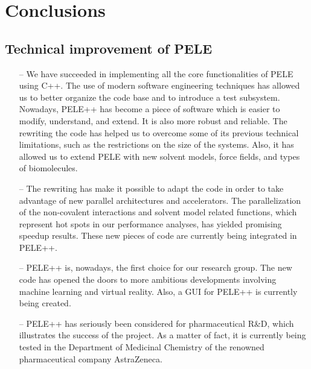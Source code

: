 \chapter{Conclusions}

\section{Technical improvement of PELE}
\begin{itemize}
\item[--] We have succeeded in implementing all the core functionalities of PELE using C++. The use of modern software engineering techniques has allowed us to better organize the code base and to introduce a test subsystem. Nowadays, PELE++ has become a piece of software which is easier to modify, understand, and extend. It is also more robust and reliable. The rewriting the code has helped us to overcome some of its previous technical limitations, such as the restrictions on the size of the systems. Also, it has allowed us to extend PELE with new solvent models, force fields, and types of biomolecules.
\item[--] The rewriting has make it possible to adapt the code in order to take advantage of new parallel architectures and accelerators. The parallelization of the non-covalent interactions and solvent model related functions, which represent hot spots in our performance analyses, has yielded promising speedup results. These new pieces of code are currently being integrated in PELE++.   
\item[--] PELE++ is, nowadays, the first choice for our research group. The new code has opened the doors to more ambitious developments involving machine learning and virtual reality. Also, a GUI for PELE++ is currently being created. 
\item[--] PELE++ has seriously been considered for pharmaceutical R\&D, which illustrates the success of the project. As a matter of fact, it is currently being tested in the Department of Medicinal Chemistry of the renowned pharmaceutical company AstraZeneca. 
\end{itemize}


